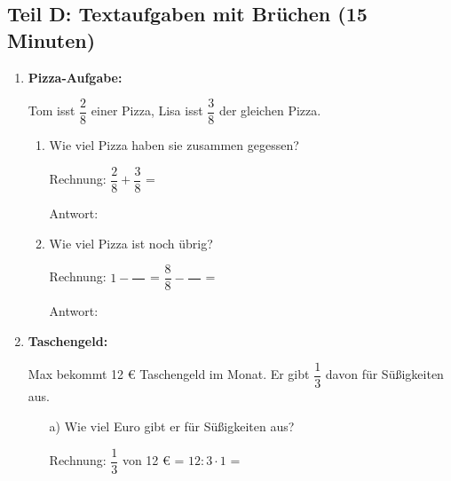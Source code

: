 \subsection*{Teil D: Textaufgaben mit Brüchen (15 Minuten)}

\begin{enumerate}[resume, label=\arabic*.]
    \item \textbf{Pizza-Aufgabe:} 

    Tom isst $\dfrac{2}{8}$ einer Pizza, Lisa isst $\dfrac{3}{8}$ der gleichen Pizza.

    \begin{enumerate}[label=\alph*)]
        \item Wie viel Pizza haben sie zusammen gegessen?

            \vspace{0.3cm}
            Rechnung: $\dfrac{2}{8} + \dfrac{3}{8}$ = \underline{\hspace{6cm}}

            \vspace{0.3cm}
            Antwort: \underline{\hspace{10cm}}

            \vspace{0.5cm}
        \item Wie viel Pizza ist noch übrig?

            \vspace{0.3cm}
            Rechnung: $1 - \dfrac{\phantom{00}}{\phantom{00}}$ = $\dfrac{8}{8} - \dfrac{\phantom{00}}{\phantom{00}}$ = \underline{\hspace{5cm}}

            \vspace{0.3cm}
            Antwort: \underline{\hspace{10cm}}
    \end{enumerate}

    \vspace{0.8cm}

    \item \textbf{Taschengeld:} 

    Max bekommt 12 € Taschengeld im Monat. Er gibt $\dfrac{1}{3}$ davon für Süßigkeiten aus.

    \vspace{0.5cm}
    \begin{itemize}
        \item[a)] Wie viel Euro gibt er für Süßigkeiten aus?

        \vspace{0.3cm}
        Rechnung: $\dfrac{1}{3}$ von 12 € = $12 : 3 \cdot 1$ = \underline{\hspace{5cm}}


\end{itemize}
\end{enumerate}
